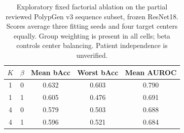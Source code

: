 \begin{table}[t]
\centering\small
\begin{tabular}{ccccc}
\hline
$K$ & $\beta$ & Mean bAcc & Worst bAcc & Mean AUROC \\
\hline
1 & 0 & 0.632 & 0.603 & 0.790 \\
1 & 1 & 0.605 & 0.476 & 0.691 \\
4 & 0 & 0.579 & 0.503 & 0.688 \\
4 & 1 & 0.596 & 0.521 & 0.684 \\
\hline\end{tabular}
\caption{Exploratory fixed factorial ablation on the partial reviewed PolypGen v3 sequence subset, frozen ResNet18. Scores average three fitting seeds and four target centers equally. Group weighting is present in all cells; beta controls center balancing. Patient independence is unverified.}
\label{tab:factorial_exploratory}
\end{table}
